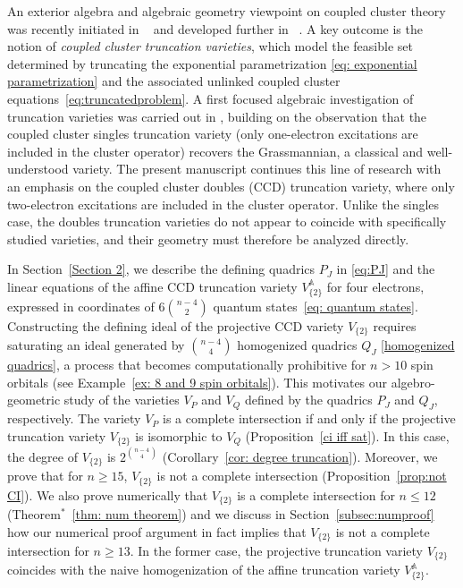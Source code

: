 \documentclass[11pt,reqno]{amsart}
\theoremstyle{definition}
\numberwithin{theorem}{section}
\numberwithin{equation}{section}
\begin{document}
An exterior algebra and algebraic geometry viewpoint on coupled cluster theory was recently initiated in ~\cite{faulstich2024coupled} and developed further in ~\cite{faulstich2024algebraic}. A key outcome is the notion of \emph{coupled cluster truncation varieties}, which model the feasible set determined by truncating the exponential parametrization \eqref{eq: exponential parametrization} and the associated unlinked coupled cluster equations~\eqref{eq:truncatedproblem}. A first focused algebraic investigation of truncation varieties was carried out in \cite{borovik2024coupled}, building on the observation that the coupled cluster singles truncation variety (only one-electron excitations are included in the cluster operator) recovers the Grassmannian, a classical and well-understood variety. The present manuscript continues this line of research with an emphasis on the coupled cluster doubles (CCD) truncation variety, where only two-electron excitations are included in the cluster operator. Unlike the singles case, the doubles truncation varieties do not appear to coincide with specifically studied varieties, and their geometry must therefore be analyzed directly.

In Section~\ref{Section 2}, we describe the defining quadrics $P_J$ in \eqref{eq:PJ} and the linear equations of the affine CCD truncation variety $V_{\{2\}}^{\mathbb A}$ for four electrons, expressed in coordinates of $6\binom{n-4}{2}$ quantum states~\eqref{eq: quantum states}. Constructing the defining ideal of the projective CCD variety $V_{\{2\}}$ requires saturating an ideal generated by $\binom{n-4}{4}$ homogenized quadrics $Q_J$ \eqref{homogenized quadrics}, a process that becomes computationally prohibitive for $n>10$ spin orbitals (see Example~\ref{ex: 8 and 9 spin orbitals}). This motivates our algebro-geometric study of the varieties $V_P$ and $V_Q$ defined by the quadrics $P_J$ and $Q_J$, respectively. The variety $V_P$ is a complete intersection if and only if the projective truncation variety $V_{\{2\}}$ is isomorphic to $V_Q$ (Proposition~\ref{ci iff sat}). In this case, the degree of $V_{\{2\}}$ is $2^{\binom{n-4}{4}}$ (Corollary~\ref{cor: degree truncation}). Moreover, we prove that for $n\geq 15$, $V_{\{2\}}$ is not a complete intersection (Proposition~\ref{prop:not CI}). We also prove numerically that $V_{\{2\}}$ is a complete intersection for $n\leq 12$ (Theorem$^*$~\ref{thm: num theorem}) and we discuss in Section~\ref{subsec:numproof} how our numerical proof argument in fact implies that $V_{\{2\}}$ is not a complete intersection for $n\geq 13$. In the former case, the projective truncation variety $V_{\{2\}}$ coincides with the naive homogenization of the affine truncation variety $V_{\{2\}}^{\mathbb A}$.
\end{document}
